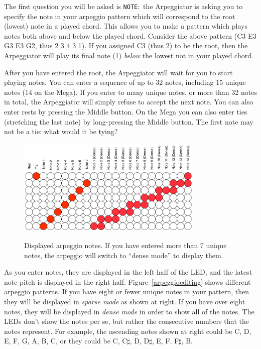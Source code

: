\documentclass{article}
\begin{document}
The first question you will be asked is \texttt{NOTE}:\ the Arpeggiator is asking you to specify the note in your arpeggio pattern which will correspond to the root (lowest) note in a played chord.  This allows you to make a pattern which plays notes both above and below the played chord.  Consider the above pattern (C3 E3 G3 E3 G2, thus 2 3 4 3 1).  If you assigned C3 (thus 2) to be the root, then the Arpeggiator will play its final note (1) {\it below} the lowest not in your played chord.

After you have entered the root, the Arpeggiator will wait for you to start playing notes.  You can enter a sequence of up to 32 notes, including 15 unique notes (14 on the Mega).  If you enter to many unique notes, or more than 32 notes in total, the Arpeggiator will simply refuse to accept the next note.  You can also enter rests by pressing the Middle button.  On the Mega you can also enter ties (stretching the last note) by long-pressing the Middle button.  The first note may not be a tie: what would it be tying?

\begin{figure}
\begin{center}
\vspace{-2.5em}
\includegraphics[width=3.5in]{arpeggionotes.pdf}\\
\end{center}
\vspace{-1em}\caption{Displayed arpeggio notes.  If you have entered more than 7 unique notes, the arpeggio will switch to ``dense mode'' to display them.}
\vspace{-1em}
\label{arpeggionotes}
\end{figure}


As you enter notes, they are displayed in the left half of the LED, and the latest note pitch is displayed in the right half. Figure~\ref{arpeggioediting} shows different arpeggio patterns.  If you have eight or fewer unique notes in your pattern, then they will be displayed in {\it sparse mode} as shown at right.  If you have over eight notes, they will be displayed in {\it dense mode} in order to show all of the notes.  The LEDs don't show the notes per se, but rather the consecutive numbers that the notes represent.  For example, the ascending notes shown at right could be C, D, E, F, G, A, B, C, or they could be C, C\(\sharp\), D, D\(\sharp\), E, F, F\(\sharp\), B.
\end{document}
